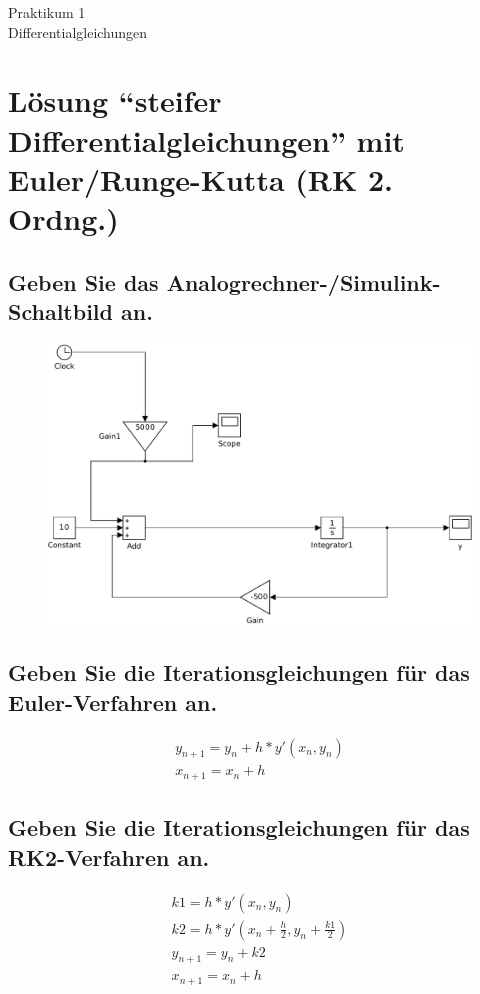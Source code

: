 \documentclass[10pt,a4paper]{article}
\begin{document}
\begin{center}
\begin{LARGE}
Praktikum 1\\
Differentialgleichungen
\end{LARGE}
\end{center}

\section{Lösung  "`steifer Differentialgleichungen"' mit Euler/Runge-Kutta (RK 2. Ordng.)}

\subsection{Geben Sie das Analogrechner-/Simulink-Schaltbild an.}
\begin{figure}[h]
\centering
\includegraphics[width=0.9\linewidth]{../screenshots/1}
\end{figure}
\subsection{Geben Sie die Iterationsgleichungen für das Euler-Verfahren an.}
\begin{subequations}
\begin{align}
y_{n+1} = y_n + h * y'(x_n,y_n)\\
x_{n+1} = x_n + h
\end{align}
\end{subequations}

\subsection{Geben Sie die Iterationsgleichungen für das RK2-Verfahren an.}
\begin{subequations}
\begin{align}
k1 = h * y'(x_n,y_n)\\
k2 = h * y'(x_n + \frac{h}{2},y_n + \frac{k1}{2})\\
y_{n+1} = y_n + k2\\
x_{n+1} = x_n + h
\end{align}
\end{subequations}
\end{document}
